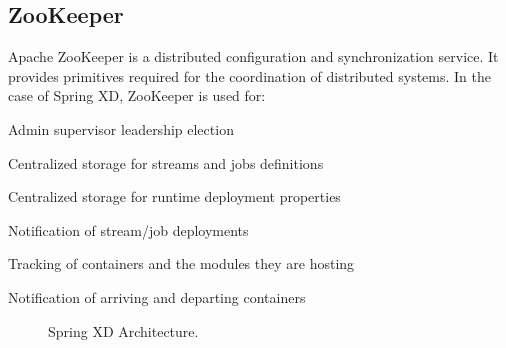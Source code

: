 \subsection{ZooKeeper}
Apache ZooKeeper is a distributed configuration and synchronization service.
It provides primitives required for the coordination of distributed systems.
In the case of Spring XD, ZooKeeper is used for: \begin{itemize*}
	\item Admin supervisor leadership election
	\item Centralized storage for streams and jobs definitions
	\item Centralized storage for runtime deployment properties
	\item Notification of stream/job deployments
	\item Tracking of containers and the modules they are hosting
	\item Notification of arriving and departing containers
\end{itemize*}
\begin{figure}[ht]
\centering
{}
\caption{Spring XD Architecture.}
\label{fig:architecture}
\end{figure}


